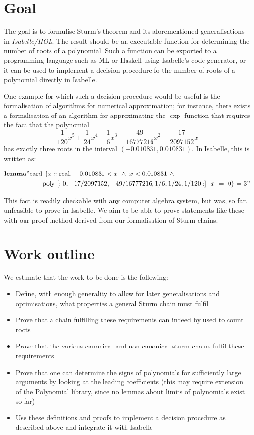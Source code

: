 \documentclass[11pt,a4paper,oneside]{article}
\newcommand{\isabellehol}{\mbox{Isabelle}\slash HOL}
\begin{document}
\section{Goal}

The goal is to formulise Sturm's theorem and its aforementioned generalisations 
in \emph{\isabellehol}. The result should be an executable function for 
determining the number of roots of a polynomial. Such a function can be 
exported to a programming language such as ML or Haskell using Isabelle's 
code generator, or it can be used to implement a decision procedure fo the 
number of roots of a polynomial directly in Isabelle.

One example for which such a decision procedure would be useful is the 
formalisation of algorithms for numerical approximation; for instance, there 
exists a formalisation of an algorithm for approximating the $\exp$ function 
that requires the fact that the polynomial 
$$\frac{1}{120}x^5+\frac{1}{24}x^4+\frac{1}{6}x^3-\frac{49}{16777216}x^2-\frac{17}{2097152}x$$
has exactly three roots in the interval $(-0.010831,0.010831)$. In Isabelle, this 
is written as:

\vspace*{-5mm}
\begin{align*}
&\textbf{lemma} "\mathrm{card}\ \{x::\mathrm{real}. -0.010831 < x\ \wedge\ x < 0.010831\ \wedge\\
&\hskip20mm \mathrm{poly}\ [:0, -17/2097152, -49/16777216, 1/6, 1/24, 1/120:]\ \ x\ =\ 0\} = 3"
\end{align*}

This fact is readily checkable with any computer algebra system, but was, so far, 
unfeasible to prove in Isabelle. We aim to be able to prove statements like these 
with our proof method derived from our formalisation of Sturm chains.


\section{Work outline}
We estimate that the work to be done is the following:
\begin{itemize}
\item Define, with enough generality to allow for later generalisations and optimisations, what 
      properties a general Sturm chain must fulfil
\item Prove that a chain fulfilling these requirements can indeed by used to count roots
\item Prove that the various canonical and non-canonical sturm chains fulfil these requirements
\item Prove that one can determine the signs of polynomials for sufficiently large arguments by 
      looking at the leading coefficients (this may require extension of the Polynomial library,
      since no lemmas about limits of polynomials exist so far)
\item Use these definitions and proofs to implement a decision procedure as described above and 
      integrate it with Isabelle
\end{itemize}
\end{document}
